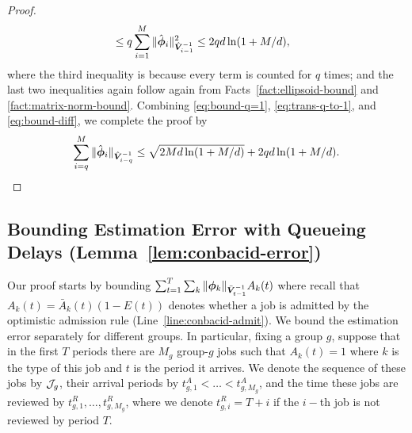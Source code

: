 \begin{proof}
\begin{align}
&\leq q\sum_{i=1}^M \|\hat{\boldsymbol{\phi}}_i\|_{\hat{\boldsymbol{V}}_{i-1}^{-1}}^2 \leq 2qd\ln(1+M/d),\label{eq:bound-diff}
\end{align}
where the third inequality is because every term is counted for $q$ times; and the last two inequalities again follow again from Facts~\ref{fact:ellipsoid-bound} and \ref{fact:matrix-norm-bound}. Combining \eqref{eq:bound-q=1}, \eqref{eq:trans-q-to-1}, and \eqref{eq:bound-diff}, we complete the proof by
\[
\sum_{i=q}^M \|\hat{\boldsymbol{\phi}}_i\|_{\hat{\boldsymbol{V}}_{i-q}^{-1}} \leq \sqrt{2Md\ln(1+M/d)}+2qd\ln(1+M/d).
\]
\end{proof}

\subsection{Bounding Estimation Error with Queueing Delays (Lemma~\ref{lem:conbacid-error})}\label{app:lem-conbacid-error}
Our proof starts by bounding $\sum_{t=1}^T \sum_k \|\boldsymbol{\phi}_k\|_{\bar{\boldsymbol{V}}_{t-1}^{-1}}A_k(t)$ where recall that $A_k(t) = \bar{A}_k(t)(1-E(t))$ denotes whether a job is admitted by the optimistic admission rule (Line~\ref{line:conbacid-admit}). We bound the estimation error separately for different groups. In particular, fixing a group $g$, suppose that in the first $T$ periods there are $M_g$ group-$g$ jobs such that $A_k(t) = 1$ where $k$ is the type of this job and $t$ is the period it arrives. We denote the sequence of these jobs by $\mathcal{J}_g$, their arrival periods by $t_{g,1}^A<\ldots<t_{g,M_g}^A$, and the time these jobs are reviewed by $t_{g,1}^R,\ldots, t_{g,M_g}^R$, where we denote $t_{g,i}^R = T+i$ if the $i-$th job is not reviewed by period $T$. 

